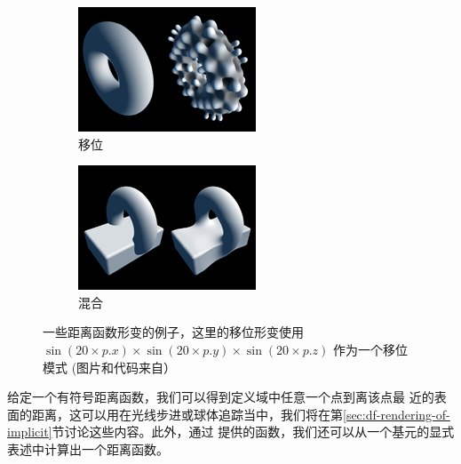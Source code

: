 \begin{figure}
	\begin{subfigure}[b]{0.5\textwidth}
		\includegraphics[width=\textwidth]{figures/df/displacement}
		\caption{移位}
	\end{subfigure}
	\begin{subfigure}[b]{0.5\textwidth}
		\includegraphics[width=\textwidth]{figures/df/blend}
		\caption{混合}
	\end{subfigure}
	\caption{一些距离函数形变的例子，这里的移位形变使用 $\sin(20 \times p.x)\times\sin(20\times p.y)\times\sin(20\times p.z)$ 作为一个移位模式 (图片和代码来自\cite{w:distance-function}）}
	\label{f:df-disform}
\end{figure}

给定一个有符号距离函数，我们可以得到定义域中任意一个点到离该点最 近的表面的距离，这可以用在光线步进或球体追踪当中，我们将在第\ref{sec:df-rendering-of-implicit}节讨论这些内容。此外，通过 \cite{w:distance-function} 提供的函数，我们还可以从一个基元的显式 表述中计算出一个距离函数。

